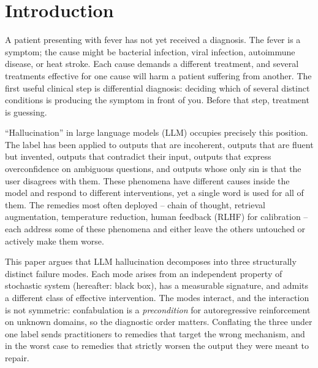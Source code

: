 \documentclass[11pt,a4paper]{article}
\begin{document}
\tableofcontents
\bigskip

\section{Introduction}
\label{sec:intro}

A patient presenting with fever has not yet received a diagnosis. The fever is a symptom; the cause might be bacterial infection, viral infection, autoimmune disease, or heat stroke. Each cause demands a different treatment, and several treatments effective for one cause will harm a patient suffering from another. The first useful clinical step is differential diagnosis: deciding which of several distinct conditions is producing the symptom in front of you. Before that step, treatment is guessing.

``Hallucination'' in large language models (LLM) occupies precisely this position. The label has been applied to outputs that are incoherent, outputs that are fluent but invented, outputs that contradict their input, outputs that express overconfidence on ambiguous questions, and outputs whose only sin is that the user disagrees with them. These phenomena have different causes inside the model and respond to different interventions, yet a single word is used for all of them. The remedies most often deployed -- chain of thought, retrieval augmentation, temperature reduction, human feedback (RLHF) for calibration -- each address some of these phenomena and either leave the others untouched or actively make them worse.

This paper argues that LLM hallucination decomposes into three structurally distinct failure modes. Each mode arises from an independent property of stochastic system (hereafter: black box), has a measurable signature, and admits a different class of effective intervention. The modes interact, and the interaction is not symmetric: confabulation is a \emph{precondition} for autoregressive reinforcement on unknown domains, so the diagnostic order matters. Conflating the three under one label sends practitioners to remedies that target the wrong mechanism, and in the worst case to remedies that strictly worsen the output they were meant to repair.
\end{document}

